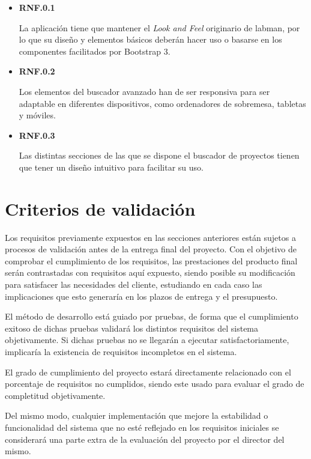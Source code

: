 \begin{itemize}
	\item \textbf{RNF.0.1}

	La aplicación tiene que mantener el \textit{Look and Feel} originario de \acrshort{labman}, por lo que su diseño y elementos básicos deberán hacer uso o basarse en los componentes facilitados por Bootstrap 3.

	\item \textbf{RNF.0.2}

	Los elementos del buscador avanzado han de ser responsiva para ser adaptable en diferentes dispositivos, como ordenadores de sobremesa, tabletas y móviles.

	\item \textbf{RNF.0.3}

	Las distintas secciones de las que se dispone el buscador de proyectos tienen que tener un diseño intuitivo para facilitar su uso.
\end{itemize}


\section{Criterios de validación}

Los requisitos previamente expuestos en las secciones anteriores están sujetos a procesos de validación antes de la entrega final del proyecto. Con el objetivo de comprobar el cumplimiento de los requisitos, las prestaciones del producto final serán contrastadas con requisitos aquí expuesto, siendo posible su modificación para satisfacer las necesidades del cliente, estudiando en cada caso las implicaciones que esto generaría en los plazos de entrega y el presupuesto. 

El método de desarrollo está guiado por pruebas, de forma que el cumplimiento exitoso de dichas pruebas validará los distintos requisitos del sistema objetivamente. Si dichas pruebas no se llegarán a ejecutar satisfactoriamente, implicaría la existencia de requisitos incompletos en el sistema.

El grado de cumplimiento del proyecto estará directamente relacionado con el porcentaje de requisitos no cumplidos, siendo este usado para evaluar el grado de completitud objetivamente.

Del mismo modo, cualquier implementación que mejore la estabilidad o funcionalidad del sistema que no esté reflejado en los requisitos iniciales se considerará una parte extra de la evaluación del proyecto por el director del mismo.